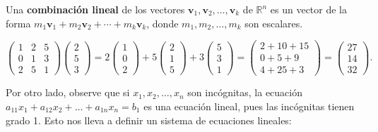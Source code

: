 \begin{definition} 
Una \textbf{combinación lineal} de los vectores $\mathbf{v}_1,\mathbf{v}_2,\ldots, \mathbf{v}_k$ de $\mathbb{R}^n$ es un vector de la forma $m_1\mathbf{v}_1+m_2\mathbf{v}_2+\cdots + m_k\mathbf{v}_k$, donde $m_1, m_2,\ldots, m_k$ son escalares.
\end{definition} 

\begin{example} 
$\begin{pmatrix} 1&2&5\\0&1&3\\2&5&1 \end{pmatrix}\begin{pmatrix} 2\\5\\3 \end{pmatrix} = 2\begin{pmatrix}1\\0\\2 \end{pmatrix}+5\begin{pmatrix} 2\\1\\5\end{pmatrix}+3\begin{pmatrix} 5\\3\\1\end{pmatrix}= \begin{pmatrix} 2+10+15\\0+5+9\\4+25+3 \end{pmatrix}= \begin{pmatrix} 27\\14\\32 \end{pmatrix}.$
\end{example}

Por otro lado, observe que si $x_1,x_2,\dots, x_n$ son incógnitas, la ecuación $a_{11}x_1+a_{12}x_2+\dots + a_{1n}x_n=b_1$ es una ecuación lineal, pues las incógnitas tienen grado 1. Esto nos lleva a definir un sistema de ecuaciones lineales:

